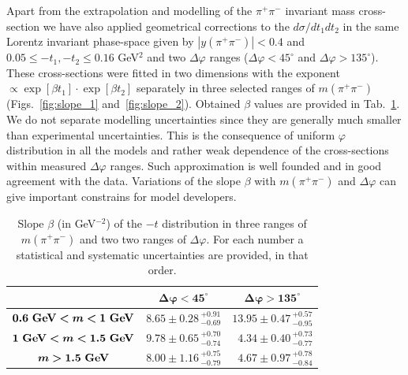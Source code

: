 Apart from the extrapolation and modelling of the $\pi^{+}\pi^{-}$ invariant mass cross-section we have also applied geometrical corrections to the $d\sigma/dt_{1}dt_{2}$ in the same Lorentz invariant phase-space given by $|y(\pi^+\pi^-)|<0.4$ and $0.05 \leq -t_1 , -t_2 \leq 0.16$ GeV$^2$ and two $\Delta\varphi$ ranges ($\Delta\varphi<45^{\circ}$ and $\Delta\varphi>135^{\circ}$). 
These cross-sections were fitted in two dimensions with the exponent $\propto \exp{\left[\beta t_{1}\right]}\cdot\exp{\left[\beta t_{2}\right]}$ separately in three selected ranges of $m(\pi^{+}\pi^{-})$ (Figs.~\ref{fig:slope_1} and~\ref{fig:slope_2}). Obtained $\beta$ values are provided in Tab.~\ref{tab:slopes}. 
We do not separate modelling uncertainties since they are generally much smaller than experimental uncertainties. This is the consequence of uniform $\varphi$ distribution in all the models and rather weak dependence of the cross-sections within measured $\Delta\varphi$ ranges. Such approximation is well founded and in good agreement with the data.
Variations of the slope $\beta$ with $m(\pi^{+}\pi^{-})$ and $\Delta\varphi$ can give important constrains for model developers.%
%

{
\renewcommand{\arraystretch}{1.5}
\begin{table}[b]\centering
\begin{tabular}{c|| cc}%
~ & $\bm{\Delta\varphi<45^{\circ}}$ & $\bm{\Delta\varphi>135^{\circ}}$\\ \hline\hline
$\bm{0.6~\text{\bf{GeV}} < m <1~\text{\bf{GeV}}}$ & $8.65 \pm 0.28 \,^{+0.91}_{-0.69}$ & $13.95 \pm 0.47\,^{+0.57}_{-0.95}$\\ %
$\bm{1~\text{\bf{GeV}} < m < 1.5~\text{\bf{GeV}}}$ & $9.78 \pm 0.65 \,^{+0.70}_{-0.74}$ & $\phantom{1}4.34 \pm 0.40\,^{+0.73}_{-0.77}$\\ %
$\bm{m>1.5~\text{\bf{GeV}}}$ & $8.00 \pm 1.16\,^{+0.75}_{-0.79}$ & $\phantom{1}4.67 \pm 0.97\,^{+0.78}_{-0.84}$\\ %
\end{tabular}
\caption{Slope $\beta$ (in GeV$^{-2}$) of the $-t$ distribution in three ranges of $m(\pi^{+}\pi^{-})$ and two two ranges of $\Delta\varphi$. For each number a statistical and systematic uncertainties are provided, in that order.}\label{tab:slopes}
\end{table}
}


